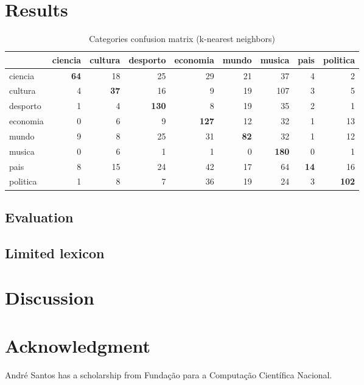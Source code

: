 \documentclass[conference]{IEEEtran}
\begin{document}
\section{Results}

\begin{table}[htbp]
    \caption{Categories confusion matrix (k-nearest neighbors)}
\begin{center}
\begin{tabular}{l|rrrrrrrr}
              & ciencia     & cultura     & desporto     & economia     & mundo       & musica       & pais        & politica \\\hline
ciencia       & \textbf{64} & 18          & 25           & 29           & 21          & 37           & 4           & 2 \\
cultura       & 4           & \textbf{37} & 16           & 9            & 19          & 107          & 3           & 5 \\
desporto      & 1           & 4           & \textbf{130} & 8            & 19          & 35           & 2           & 1 \\
economia      & 0           & 6           & 9            & \textbf{127} & 12          & 32           & 1           & 13 \\
mundo         & 9           & 8           & 25           & 31           & \textbf{82} & 32           & 1           & 12 \\
musica        & 0           & 6           & 1            & 1            & 0           & \textbf{180} & 0           & 1 \\
pais          & 8           & 15          & 24           & 42           & 17          & 64           & \textbf{14} & 16 \\
politica      & 1           & 8           & 7            & 36           & 19          & 24           & 3           & \textbf{102} \\

\end{tabular}
\label{tab1}
\end{center}
\end{table}
\subsection{Evaluation}
\subsection{Limited lexicon}

\section{Discussion}


\section*{Acknowledgment}

André Santos has a scholarship from Fundação para a
Computação Científica Nacional.



\end{document}
